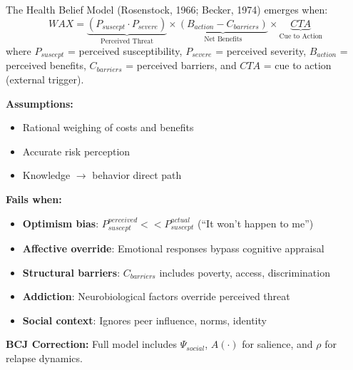 \begin{theorem}
\label{thm:health-belief}
The Health Belief Model (Rosenstock, 1966; Becker, 1974) emerges when:
\begin{equation}
\boxed{WAX = \underbrace{(P_{suscept} \cdot P_{severe})}_{\text{Perceived Threat}} \times \underbrace{(B_{action} - C_{barriers})}_{\text{Net Benefits}} \times \underbrace{CTA}_{\text{Cue to Action}}}
\end{equation}
where $P_{suscept}$ = perceived susceptibility, $P_{severe}$ = perceived severity, $B_{action}$ = perceived benefits, $C_{barriers}$ = perceived barriers, and $CTA$ = cue to action (external trigger).
\end{theorem}

\begin{tcolorbox}[colback=red!5!white, colframe=red!75!black, title=Boundary Condition: Where HBM Fails]
\textbf{Assumptions:}
\begin{itemize}[nosep]
\item Rational weighing of costs and benefits
\item Accurate risk perception
\item Knowledge $\to$ behavior direct path
\end{itemize}

\textbf{Fails when:}
\begin{itemize}[nosep]
\item \textbf{Optimism bias}: $P_{suscept}^{perceived} << P_{suscept}^{actual}$ (``It won't happen to me'')
\item \textbf{Affective override}: Emotional responses bypass cognitive appraisal
\item \textbf{Structural barriers}: $C_{barriers}$ includes poverty, access, discrimination
\item \textbf{Addiction}: Neurobiological factors override perceived threat
\item \textbf{Social context}: Ignores peer influence, norms, identity
\end{itemize}

\textbf{BCJ Correction:} Full model includes $\Psi_{social}$, $A(\cdot)$ for salience, and $\rho$ for relapse dynamics.
\end{tcolorbox}


